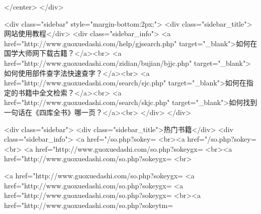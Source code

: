 </center>
</div>

<div class="sidebar"  style="margin-bottom:2px;">
<div class="sidebar_title">网站使用教程</div>
<div class="sidebar_info">
<a href="http://www.guoxuedashi.com/help/gjsearch.php" target="_blank">如何在国学大师网下载古籍？</a><br>
<a href="http://www.guoxuedashi.com/zidian/bujian/bjjc.php" target="_blank">如何使用部件查字法快速查字？</a><br>
<a href="http://www.guoxuedashi.com/search/sjc.php" target="_blank">如何在指定的书籍中全文检索？</a><br>
<a href="http://www.guoxuedashi.com/search/skjc.php" target="_blank">如何找到一句话在《四库全书》哪一页？</a><br>
</div>
</div>


<div class="sidebar">
<div class="sidebar_title">热门书籍</div>
<div class="sidebar_info">
<a href="/so.php?sokey=%
<br><a href="/so.php?sokey=%
<br>
<a href="http://www.guoxuedashi.com/so.php?sokeygx=%
<br><a href="http://www.guoxuedashi.com/so.php?sokeygx=%
<br>

<a href="http://www.guoxuedashi.com/so.php?sokeygx=%
<a href="http://www.guoxuedashi.com/so.php?sokeygx=%
<a href="http://www.guoxuedashi.com/so.php?sokeygx=%
<br><a href="http://www.guoxuedashi.com/so.php?sokeytm=%

